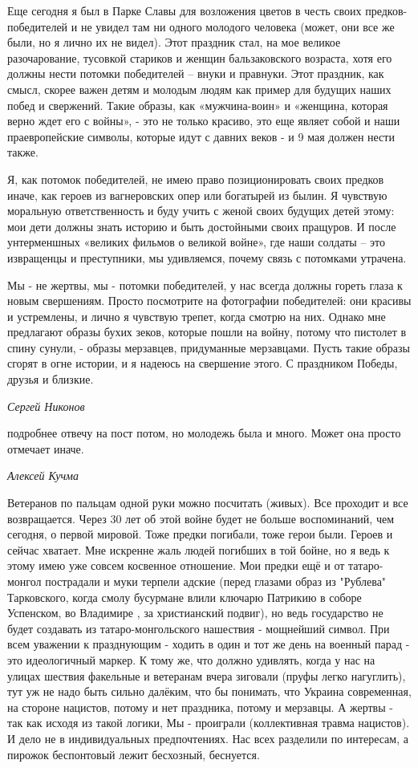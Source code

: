 Еще сегодня я был в Парке Славы для возложения цветов в честь своих
предков-победителей и не увидел там ни одного молодого человека (может, они все
же были, но я лично их не видел). Этот праздник стал, на мое великое
разочарование, тусовкой стариков и женщин бальзаковского возраста, хотя его
должны нести потомки победителей – внуки и правнуки. Этот праздник, как смысл,
скорее важен детям и молодым людям как пример для будущих наших побед и
свержений. Такие образы, как «мужчина-воин» и «женщина, которая верно ждет его
с войны», - это не только красиво, это еще являет собой и наши праевропейские
символы, которые идут с давних веков - и 9 мая должен нести также. 

Я, как потомок победителей, не имею право позиционировать своих предков иначе,
как героев из вагнеровских опер или богатырей из  былин. Я чувствую моральную
ответственность и буду учить с женой своих будущих детей этому: мои дети должны
знать историю и быть достойными своих пращуров. И после унтерменшных «великих
фильмов о великой войне», где наши солдаты – это извращенцы и преступники, мы
удивляемся, почему связь с потомками утрачена. 

Мы - не жертвы, мы - потомки победителей, у нас всегда должны гореть глаза к
новым свершениям. Просто посмотрите на фотографии победителей: они красивы и
устремлены, и лично я чувствую трепет, когда смотрю на них. Однако мне
предлагают образы бухих зеков, которые пошли на войну, потому что пистолет в
спину сунули, - образы мерзавцев, придуманные мерзавцами. Пусть такие образы
сгорят в огне истории, и я надеюсь на свершение этого. С праздником Победы,
друзья и близкие.

\emph{Сергей Никонов}

подробнее отвечу на пост потом, но молодежь была и много. Может она просто
отмечает иначе.

\emph{Алексей Кучма}

Ветеранов по пальцам одной руки можно посчитать (живых). Все проходит и все
возвращается. Через 30 лет об этой войне будет не больше воспоминаний, чем
сегодня, о первой мировой. Тоже предки погибали, тоже герои были. Героев и
сейчас хватает. Мне искренне жаль людей погибших в той бойне, но я ведь к этому
имею уже совсем косвенное отношение. Мои предки ещё и от татаро-монгол
пострадали и муки терпели адские (перед глазами образ из "Рублева" Тарковского,
когда смолу бусурмане влили ключарю Патрикию в соборе Успенском, во Владимире ,
за христианский подвиг), но ведь государство не будет создавать из
татаро-монгольского нашествия - мощнейший символ. При всем уважении к
празднующим - ходить в один и тот же день на военный парад - это идеологичный
маркер. К тому же, что должно удивлять, когда у нас на улицах шествия факельные
и ветеранам вчера зиговали (пруфы легко нагуглить), тут уж не надо быть сильно
далёким, что бы понимать, что Украина современная, на стороне нацистов, потому
и нет праздника, потому и мерзавцы. А жертвы - так как исходя из такой логики,
Мы - проиграли (коллективная травма нацистов). И дело не в индивидуальных
предпочтениях. Нас всех разделили по интересам, а пирожок беспонтовый лежит
бесхозный, беснуется.
